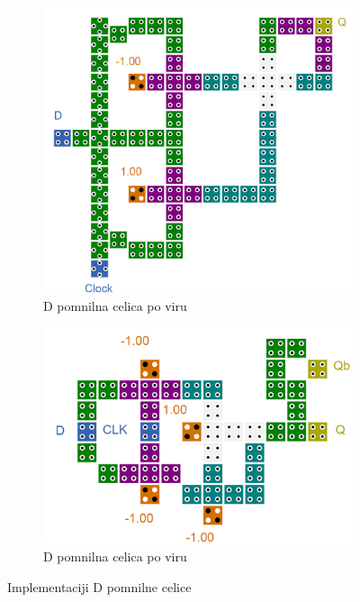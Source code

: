 \documentclass[a4paper, 11pt]{article}
\begin{document}
\begin{figure}[h!]
	\begin{subfigure}[b]{0.5\textwidth}
	\includegraphics[width=\textwidth]{../img/vir_4/d.png}
	\caption{D pomnilna celica po viru \cite{quantum_dot}}
	\label{fig-d-1}
	\end{subfigure}
	\begin{subfigure}[b]{0.5\textwidth}
	\includegraphics[width=\textwidth]{../img/vir_5/d.png} 
	\caption{D pomnilna celica po viru \cite{a_novel_approach}}
	\label{fig-d-2}
	\end{subfigure}
	\caption{Implementaciji D pomnilne celice}
	\label{fig-d}
\end{figure}
\end{document}
